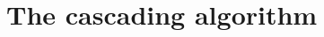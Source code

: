 \documentclass[11pt]{article}
\begin{document}
\section{The cascading algorithm}
\label{sec:algo}
\end{document}
